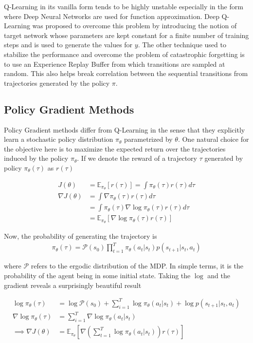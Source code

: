 \documentclass[12pt,a4paper]{article}
\begin{document}
Q-Learning in its vanilla form tends to be highly unstable especially in the form where Deep
Neural Networks are used for function approximation. Deep Q-Learning \cite{mnih2015human}
was proposed to overcome this problem by introducing the notion of target network whose
parameters are kept constant for a finite number of training steps and is used to generate the
values for $y$. The other technique used to stabilize the performance and overcome the
problem of catastrophic forgetting is to use an Experience Replay Buffer from which transitions
are sampled at random. This also helps break correlation between the sequential transitions
from trajectories generated by the policy $\pi$.

\subsection{Policy Gradient Methods}

Policy Gradient methods differ from Q-Learning in the sense that they explicitly learn a 
stochastic policy distribution $\pi_\theta$ parametrized by $\theta$. One natural choice for
the objective here is to maximize the expected return over the trajectories induced by the policy
$\pi_\theta$. If we denote the reward of a trajectory $\tau$ generated by policy $\pi_\theta(\tau)$
as $r(\tau)$

\begin{align} \label{eq:policy_grad_objective}
J(\theta) &= \mathbb{E}_{\pi_\theta}\left[ r(\tau) \right] = \int \pi_\theta(\tau)r(\tau) d\tau \\
\nabla J(\theta) &= \int \nabla \pi_\theta(\tau)r(\tau) d\tau \\ \nonumber
&= \int \pi_\theta(\tau) \nabla \log \pi_\theta(\tau)r(\tau) d\tau \\ \nonumber
&= \mathbb{E}_{\pi_\theta}\left[ \nabla \log \pi_\theta(\tau)r(\tau) \right] 
\end{align}

Now, the probability of generating the trajectory is 
\begin{align}
\pi_\theta(\tau) = \mathcal{P}(s_0) \prod_{t=1}^T \pi_\theta(a_t|s_t) p(s_{t+1}|s_t,a_t)
\end{align}

where $\mathcal{P}$ refers to the ergodic distribution of the MDP. In simple terms, it is the
probability of the agent being in some initial state. Taking the $\log$ and the gradient reveals
a surprisingly beautiful result

\begin{align}
\log \pi_\theta(\tau) &= \log \mathcal{P}(s_0) + \sum_{i=1}^T \log \pi_\theta(a_t|s_t)  + \log p(s_{t+1}|s_t,a_t) \\ \nonumber
\nabla \log \pi_\theta(\tau) &= \sum_{i=1}^T \nabla \log \pi_\theta(a_t|s_t) \\ \nonumber
\implies \nabla J(\theta) &= \mathbb{E}_{\pi_\theta}\left[ \nabla \left(\sum_{t=1}^T \log \pi_\theta(a_t|s_t) \right) r(\tau) \right]
\end{align}
\end{document}
